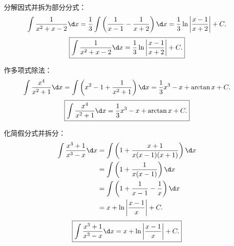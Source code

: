 \begin{solution}

    分解因式并拆为部分分式：
    \begin{equation}
        \int \frac{1}{x^2 + x - 2} \d x = \frac{1}{3}\int \left( \frac{1}{x - 1} - \frac{1}{x + 2} \right) \d x = \frac{1}{3}\ln\left| \frac{x - 1}{x + 2} \right| + C.
    \end{equation}
    \begin{equation}
        \boxed{\int \frac{1}{x^2 + x - 2} \d x = \frac{1}{3}\ln\left| \frac{x - 1}{x + 2} \right| + C.}
    \end{equation}


    作多项式除法：
    \begin{equation}
        \int \frac{x^4}{x^2 + 1} \d x = \int \left( x^2 - 1 + \frac{1}{x^2 + 1} \right) \d x = \frac{1}{3}x^3 - x + \arctan x + C.
    \end{equation}
    \begin{equation}
        \boxed{\int \frac{x^4}{x^2 + 1} \d x = \frac{1}{3}x^3 - x + \arctan x + C.}
    \end{equation}


    化简假分式并拆分：
    \begin{equation}
        \begin{aligned}
            \int \frac{x^3 + 1}{x^3 - x} \d x & = \int \left( 1 + \frac{x + 1}{x(x - 1)(x + 1)} \right) \d x \\
                                              & = \int \left( 1 + \frac{1}{x(x - 1)} \right) \d x            \\
                                              & = \int \left( 1 + \frac{1}{x - 1} - \frac{1}{x} \right) \d x \\
                                              & = x + \ln\left| \frac{x - 1}{x} \right| + C.
        \end{aligned}
    \end{equation}
    \begin{equation}
        \boxed{\int \frac{x^3 + 1}{x^3 - x} \d x = x + \ln\left| \frac{x - 1}{x} \right| + C.}
    \end{equation}



\end{solution}
